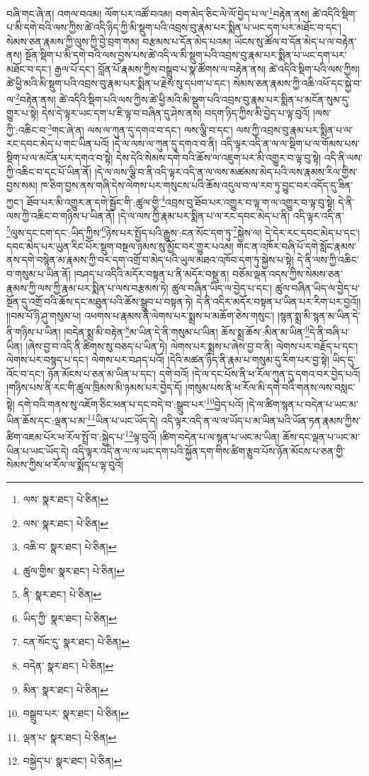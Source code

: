 བཞི་གང་ཞེ་ན། འགལ་བའམ། ལོག་པར་འཚོ་བའམ། བག་མེད་ཅིང་ལེ་ལོ་བྱེད་པ་ལ་\footnote{ལས་  སྣར་ཐང་།  པེ་ཅིན། }བརྟེན་ནས། ཚེ་འདིའི་སྡིག་པ་མི་དགེ་བའི་ལས་ཀྱིས་ཚེ་འདི་ཉིད་ཀྱི་མི་སྡུག་པའི་འབྲས་བུ་རྣམ་པར་སྨིན་པ་ཡང་དག་པར་མཐོང་བ་དང་། སེམས་ཅན་རྣམས་ཀྱི་ལུས་ཀྱི་བྱེ་བྲག་གམ། བརྩམས་པ་དོན་མེད་པའམ། ཡོངས་སུ་ཚོལ་བ་དོན་མེད་པ་ལ་བརྟེན་ནས། སྔོན་སྡིག་པ་མི་དགེ་བའི་ལས་བྱས་པས་ཚེ་འདི་ལ་མི་སྡུག་པའི་འབྲས་བུ་རྣམ་པར་སྨིན་པ་ཡང་དག་པར་མཐོང་བ་དང་། རྒྱལ་པོ་དང་། བློན་པོ་རྣམས་ཀྱིས་བསྒྲུབ་པ་སྣ་ཚོགས་ལ་བརྟེན་ནས། ཚེ་འདིའི་སྡིག་པའི་ལས་ཀྱིས། ཚེ་ཕྱི་མའི་མི་སྡུག་པའི་འབྲས་བུ་རྣམ་པར་སྨིན་པ་རྗེས་སུ་དཔག་པ་དང་། སེམས་ཅན་རྣམས་ཀྱི་འཆི་འཕོ་དང་སྐྱེ་བ་ལ་\footnote{ལས་  སྣར་ཐང་།  པེ་ཅིན། }བརྟེན་ནས། ཚེ་འདིའི་སྡིག་པའི་ལས་ཀྱིས་ཚེ་ཕྱི་མའི་མི་སྡུག་པའི་འབྲས་བུ་རྣམ་པར་སྨིན་པ་མངོན་སུམ་དུ་གྱུར་པ་སྟེ། དེས་དེ་ལྟར་ཡང་དག་པ་ཇི་ལྟ་བ་བཞིན་དུ་ཤེས་ནས། བདག་ཉིད་ཀྱིས་མི་བྱེད་པ་ལྟ་བུའོ། །ལས་ཀྱི་:འཆིང་བ་\footnote{འཆི་བ་  སྣར་ཐང་།  པེ་ཅིན། }གང་ཞེ་ན། ལས་ལ་ཀུན་དུ་དགའ་བ་དང་། ལས་ལྕི་བ་དང་། ལས་ཀྱི་འབྲས་བུ་རྣམ་པར་སྨིན་པ་ལ་རང་དབང་མེད་པ་གང་ཡིན་པའོ། །དེ་ལ་ལས་ལ་ཀུན་དུ་དགའ་བ་ནི། འདི་ལྟར་འདི་ན་ལ་ལ་སྡིག་པ་ལ་གོམས་པས་སྡིག་པ་ལ་མངོན་པར་དགའ་བ་སྟེ། དེས་དེའི་སེམས་དགེ་བའི་ཆོས་ལ་འཇུག་པར་མི་འགྱུར་བ་ལྟ་བུ་སྟེ། འདི་ནི་ལས་ཀྱི་འཆིང་བ་དང་པོ་ཡིན་ནོ། །དེ་ལ་ལས་ལྕི་བ་ནི་འདི་ལྟར་འདི་ན་ལ་ལས་མཚམས་མེད་པའི་ལས་རྣམས་རིལ་གྱིས་བྱས་སམ། ཁ་ཅིག་བྱས་ནས་གཞི་དེས་ལེགས་པར་གསུངས་པའི་ཆོས་འདུལ་བ་ལ་རབ་ཏུ་བྱུང་བར་འདོད་དུ་ཟིན་ཀྱང་། ཐོབ་པར་མི་འགྱུར་ན་དགེ་སྦྱོང་གི་:ཚུལ་གྱི་\footnote{ཚུལ་གྱིས་  སྣར་ཐང་།  པེ་ཅིན། }འབྲས་བུ་ཐོབ་པར་འགྱུར་བ་ལྟ་ག་ལ་འགྱུར་བ་ལྟ་བུ་སྟེ། དེ་ནི་ལས་ཀྱི་འཆིང་བ་གཉིས་པ་ཡིན་ནོ། །དེ་ལ་ལས་ཀྱི་རྣམ་པར་སྨིན་པ་ལ་རང་དབང་མེད་པ་ནི། འདི་ལྟར་འདི་ན་\footnote{ནི་  སྣར་ཐང་།  པེ་ཅིན། }ལུས་དང་ངག་དང་:ཡིད་ཀྱིས་\footnote{ཡིད་ཀྱི་  སྣར་ཐང་།  པེ་ཅིན། }ཉེས་པར་སྤྱོད་པའི་རྒྱུས་:ངན་སོང་དག་ཏུ་\footnote{ངན་སོང་དུ་  སྣར་ཐང་།  པེ་ཅིན། }སྐྱེས་ལ། དེ་དེར་རང་དབང་མེད་པ་དང་། དབང་མེད་པར་ཡུན་རིང་པོར་སྡུག་བསྔལ་ཉམས་སུ་མྱོང་བར་གྱུར་པའམ། གང་ན་འཁོར་བཞི་པོ་དགེ་སློང་རྣམས་ནས་དགེ་བསྙེན་མ་རྣམས་ཀྱི་བར་དག་འགྲོ་བ་མེད་པའི་ཡུལ་མཐའ་འཁོབ་དག་ཏུ་སྐྱེས་པ་སྟེ། དེ་ནི་ལས་ཀྱི་འཆིང་བ་གསུམ་པ་ཡིན་ནོ། །བཤད་པ་འདིའི་མདོར་བསྟན་པ་ནི་མདོར་བསྡུ་ན། བཅོམ་ལྡན་འདས་ཀྱིས་སེམས་ཅན་རྣམས་ཀྱི་ལས་ཀྱི་རྣམ་པར་སྨིན་པ་ལས་བརྩམས་ཏེ། ཚུལ་བཞིན་ཡིད་ལ་བྱེད་པ་དང་། ཚུལ་བཞིན་ཡིད་ལ་བྱེད་པ་སྔོན་དུ་འགྲོ་བའི་ཆོས་དང་མཐུན་པའི་ཆོས་སྒྲུབ་པ་བསྟན་ཏེ། དེ་ནི་འདིར་མདོར་བསྟན་པ་ཡིན་པར་རིག་པར་བྱའོ།། །།བམ་པོ་ཉི་ཤུ་གསུམ་པ། འཕགས་པ་རྣམས་ནི་ལེགས་པར་སྨྲས་པ་མཆོག་ཅེས་གསུང་། །སྙན་སྨྲ་མི་སྙན་མ་ཡིན་དེ་ནི་གཉིས་པ་ཡིན། །བདེན་སྨྲ་མི་བརྟེན་\footnote{བདེན་  སྣར་ཐང་།  པེ་ཅིན། }མ་ཡིན་དེ་ནི་གསུམ་པ་ཡིན། ཆོས་སྨྲ་ཆོས་:མིན་མ་ཡིན་\footnote{མིན་  སྣར་ཐང་།  པེ་ཅིན། }དེ་ནི་བཞི་པ་ཡིན། །ཞེས་བྱ་བ་འདི་ནི་ཚིགས་སུ་བཅད་པ་ཡིན་ཏེ། ལེགས་པར་སྨྲས་པ་ཞེས་བྱ་བ་ནི། ལེགས་པར་བརྗོད་པ་དང་། ལེགས་པར་བསྙད་པ་དང་། ལེགས་པར་བཤད་པའོ། །དེའི་མཚན་ཉིད་ནི་རྣམ་པ་གསུམ་དུ་རིག་པར་བྱ་སྟེ། ཡིད་དུ་འོང་བ་དང་། ཉོན་མོངས་པ་ཅན་མ་ཡིན་པ་དང་། དགེ་བའོ། །དེ་ལ་དང་པོས་ནི་ཕ་རོལ་ཀུན་དུ་དགའ་བར་བྱེད་པའོ། །གཉིས་པས་ནི་རང་གི་ཚུལ་ཁྲིམས་མི་ཉམས་པར་བྱེད་དོ། །གསུམ་པས་ནི་ཕ་རོལ་མི་དགེ་བའི་གནས་ལས་བསླང་སྟེ། དགེ་བའི་གནས་སུ་འཇོག་ཅིང་ཕན་པ་དང་བདེ་བ་:སྒྲུབ་པར་\footnote{བསྒྲུབ་པར་  སྣར་ཐང་།  པེ་ཅིན། }བྱེད་པའོ། །དེ་ལ་ཚིག་སྙན་པ་བདེན་པ་ཡང་མ་ཡིན་ཆོས་དང་:ལྡན་པ་མ་\footnote{ལྡན་པ་  སྣར་ཐང་།  པེ་ཅིན། }ཡིན་པ་ཡང་ཡོད་དེ། འདི་ལྟར་འདི་ན་ལ་ལ་ཡོད་པ་མ་ཡིན་པའི་ཡོན་ཏན་རྣམས་ཀྱིས་ཚིག་འཇམ་པོར་ཕ་རོལ་སྤྲོ་བ་:སྐྱེད་པ་\footnote{བསྐྱེད་པ་  སྣར་ཐང་།  པེ་ཅིན། }ལྟ་བུའོ། །ཚིག་བདེན་པ་ལ་སྙན་པ་ཡང་མ་ཡིན། ཆོས་དང་ལྡན་པ་ཡང་མ་ཡིན་པ་ཡང་ཡོད་དེ། འདི་ལྟར་འདི་ན་ལ་ལ་ཡང་དག་པའི་སྐྱོན་དག་གིས་ཚིག་རྩུབ་པོས་ཉོན་མོངས་པ་ཅན་གྱི་སེམས་ཀྱིས་ཕ་རོལ་ལ་སྨོད་པ་ལྟ་བུའོ། 